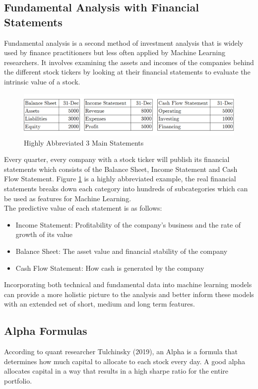 \documentclass[a4paper,12pt]{report}
\numberwithin{equation}{section}
\theoremstyle{definition}
\begin{document}
\subsection{Fundamental Analysis with Financial Statements}
Fundamental analysis is a second method of investment analysis that is widely used by finance practitioners but less often applied by Machine Learning researchers. It involves examining the assets and incomes of the companies behind the different stock tickers by looking at their financial statements to evaluate the intrinsic value of a stock. 
\begin{figure}[H]
  \centerline{\includegraphics[width=17cm]{financial_statements}}
  \caption{Highly Abbreviated 3 Main Statements}
  \label{fig:financial statements}
\end{figure}
Every quarter, every company with a stock ticker will publish its financial statements which consists of the Balance Sheet, Income Statement and Cash Flow Statement. Figure \ref{fig:financial statements} is a highly abbreviated example, the real financial statements breaks down each category into hundreds of subcategories which can be used as features for Machine Learning.\\

The predictive value of each statement is as follows:
\begin{itemize}
  \item {Income Statement: Profitability of the company's business and the rate of growth of its value}
  \item {Balance Sheet: The asset value and financial stability of the company }
  \item {Cash Flow Statement: How cash is generated by the company}
\end{itemize}

Incorporating both technical and fundamental data into machine learning models can provide a more holistic picture to the analysis and better inform these models with an extended set of short, medium and long term features.

\subsection{Alpha Formulas}
According to quant researcher Tulchinsky (2019), an Alpha is a formula that determines how much capital to allocate to each stock every day. A good alpha allocates capital in a way that results in a high sharpe ratio for the entire portfolio.\\
\end{document}
